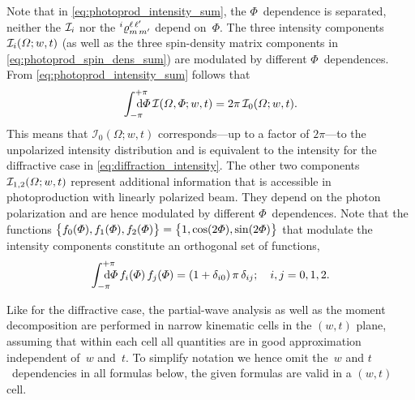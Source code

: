 Note that in \cref{eq:photoprod_intensity_sum}, the $\Phi$~dependence
is separated, \ie neither the $\mathcal{I}_i$ nor the
$\prescript{i}{}{\varrho}^{\ell\, \ell'}_{m\, m'}$ depend on~$\Phi$.
The three intensity components $\mathcal{I}_i(\Omega; w, t)$ (as well
as the three spin-density matrix components in
\cref{eq:photoprod_spin_dens_sum}) are modulated by different
$\Phi$~dependences.  From \cref{eq:photoprod_intensity_sum} follows
that
\begin{equation}
  \label{eq:photoprod_unpolarized_intensity}
  \int_{-\pi}^{+\pi}\hspace{-1.2em} \dif{\Phi}\, \intensity(\Omega, \Phi; w, t)
  = 2 \pi\, \intensity_0(\Omega; w, t).
\end{equation}
This means that $\mathcal{I}_0(\Omega; w, t)$ corresponds---up to a
factor of $2 \pi$---to the unpolarized intensity distribution and is
equivalent to the intensity for the diffractive case in
\cref{eq:diffraction_intensity}.  The other two components
$\mathcal{I}_{1, 2}(\Omega; w, t)$ represent additional information
that is accessible in photoproduction with linearly polarized beam.
They depend on the photon polarization and are hence modulated by
different $\Phi$~dependences.  Note that the functions
$\cBrk[1]{f_0(\Phi), f_1(\Phi), f_2(\Phi)} = \cBrk[1]{1, \cos(2 \Phi),
\sin(2 \Phi)}$ that modulate the intensity components constitute an
orthogonal set of functions, \ie
\begin{equation}
  \label{eq:photoprod_orthogonality_phi}
  \int_{-\pi}^{+\pi}\hspace{-1.2em} \dif{\Phi}\, f_i(\Phi)\, f_j(\Phi)
  = (1 + \delta_{i 0})\, \pi\, \delta_{i j};
  \quad i, j = 0 ,1, 2.
\end{equation}

Like for the diffractive case, the partial-wave analysis as well as
the moment decomposition are performed in narrow kinematic cells in
the $(w, t)$ plane, assuming that within each cell all quantities are
in good approximation independent of~$w$ and~$t$.  To simplify
notation we hence omit the~$w$ and $t$~dependencies in all formulas
below, \ie the given formulas are valid in a $(w, t)$ cell.

